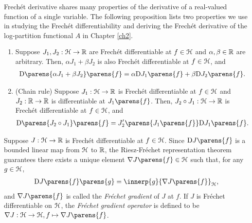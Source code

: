 Frech{\'e}t derivative shares many properties of the derivative of a real-valued function of a single variable. The following proposition lists two properties we use in studying the Frech{\'e}t differentiability and deriving the Frech{\'e}t derivative of the log-partition functional $A$ in Chapter \ref{ch2}. 

\begin{proposition}\label{prop-property-frechet-differentiable}
\leavevmode
	\begin{enumerate}[label=(\alph*)]
		\item \label{prop-property-frechet-differentiable-a} Suppose $J_1, J_2: \mathcal{H} \to \mathbb{R}$ are Frech{\'e}t differentiable at $f \in \mathcal{H}$ and $\alpha, \beta \in \mathbb{R}$ are arbitrary. Then, $\alpha J_1 + \beta J_2$ is also Frech{\'e}t differentiable at $f \in \mathcal{H}$, and 
		\begin{align*}
			\Diff \parens{\alpha J_1 + \beta J_2} \parens{f} = \alpha \Diff J_1 \parens{f} + \beta \Diff J_2 \parens{f}. 
		\end{align*}
		
		\item \label{prop-property-frechet-differentiable-b} (Chain rule) Suppose $J_1: \mathcal{H} \to \mathbb{R}$ is Frech{\'e}t differentiable at $f \in \mathcal{H}$ and $J_2: \mathbb{R} \to \mathbb{R}$ is differentiable at $J_1 \parens{f}$. Then, $J_2 \circ J_1: \mathcal{H} \to \mathbb{R}$ is Frech{\'e}t differentiable at $f \in \mathcal{H}$, and 
		\begin{align}
			\Diff \parens{J_2 \circ J_1} \parens{f} = J_2' \parens{J_1 \parens{f}} \Diff J_1 \parens{f}. 
		\end{align}
	\end{enumerate}
\end{proposition}

\begin{definition}\label{def-frechet-gradient}
	Suppose $J: \mathcal{H} \to \mathbb{R}$ is Frech{\'e}t differentiable at $f \in \mathcal{H}$. Since $\Diff J \parens{f}$ is a bounded linear map from $\mathcal{H}$ to $\mathbb{R}$, the Riesz-Fr{\'e}chet representation theorem \parencites[Fact 2.24 in][]{Bauschke2017-he} guarantees there exists a unique element $\nabla J \parens{f} \in \calH$ such that, for any $g \in \mathcal{H}$, 
	\begin{align}\label{eq-frechet-grad}
		\Diff J \parens{f} \parens{g} = \innerp{g}{\nabla J \parens{f}}_{\calH}, 
	\end{align}
	and $\nabla J \parens{f}$ is called the \textit{Fr{\'e}chet gradient} of $J$ at $f$. If $J$ is Fr{\'e}chet differentiable on $\mathcal{H}$, the \textit{Fr{\'e}chet gradient operator} is defined to be $\nabla J: \calH \to \calH, f \mapsto \nabla J \parens{f}$. 
\end{definition}

